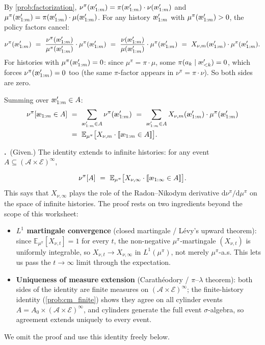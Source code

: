 \documentclass[fontsize=11pt, parskip=half]{scrartcl}
\theoremstyle{definition}
\newenvironment{solution}{%
    \begin{tcolorbox}[colback=black!5!white, colframe=black!50!white,
      title={\textbf{Solution}}, fonttitle=\normalfont, breakable]
  }{\end{tcolorbox}}
\newenvironment{solution}{\expandafter\comment}{\expandafter\endcomment}
\newcommand{\mysubsection}[2]{\par\medskip\noindent\refstepcounter{subsection}\textbf{\thesubsection.}~#2\par\smallskip}
\newcommand{\cA}{\mathcal{A}}
\newcommand{\cE}{\mathcal{E}}
\newcommand{\Ex}{\mathbb{E}}
\newcommand{\aes}{\textnormal{\ae}}
\begin{document}
\begin{solution}
By \cref{prob:factorization}, $\nu^\pi(\aes'_{1:m}) = \pi(\aes'_{1:m}) \cdot \nu(\aes'_{1:m})$ and $\mu^\pi(\aes'_{1:m}) = \pi(\aes'_{1:m}) \cdot \mu(\aes'_{1:m})$.
For any history $\aes'_{1:m}$ with $\mu^\pi(\aes'_{1:m}) > 0$, the policy factors cancel:
\[
    \nu^\pi(\aes'_{1:m})
    ~=~ \frac{\nu^\pi(\aes'_{1:m})}{\mu^\pi(\aes'_{1:m})} \cdot \mu^\pi(\aes'_{1:m})
    ~=~ \frac{\nu(\aes'_{1:m})}{\mu(\aes'_{1:m})} \cdot \mu^\pi(\aes'_{1:m})
    ~=~ X_{\nu,m}(\aes'_{1:m}) \cdot \mu^\pi(\aes'_{1:m}).
\]
For histories with $\mu^\pi(\aes'_{1:m}) = 0$: since $\mu^\pi = \pi \cdot \mu$, some $\pi(a_k \mid \aes'_{<k}) = 0$, which forces $\nu^\pi(\aes'_{1:m}) = 0$ too (the same $\pi$-factor appears in $\nu^\pi = \pi \cdot \nu$). So both sides are zero.

Summing over $\aes'_{1:m} \in A$:
\begin{align*}
    \nu^\pi[\aes_{1:m} \in A]
    ~&=~ \sum_{\aes'_{1:m} \in A} \nu^\pi(\aes'_{1:m})
    ~=~ \sum_{\aes'_{1:m} \in A} X_{\nu,m}(\aes'_{1:m}) \cdot \mu^\pi(\aes'_{1:m}) \\
    ~&=~ \Ex_{\mu^\pi}\big[X_{\nu,m} \cdot \llbracket \aes_{1:m} \in A \rrbracket\big].
\end{align*}
\end{solution}

\mysubsection{2}{\textup{(Given.)} The identity extends to infinite histories: for any event $A \subseteq (\cA \times \cE)^\infty$, \label{prob:cm_extension}}
\[
    \nu^\pi[A] ~=~ \Ex_{\mu^\pi}\big[X_{\nu,\infty} \cdot \llbracket \aes_{1:\infty} \in A \rrbracket\big].
\]
This says that $X_{\nu,\infty}$ plays the role of the Radon--Nikodym derivative $\mathrm{d}\nu^\pi/\mathrm{d}\mu^\pi$ on the space of infinite histories. The proof rests on two ingredients beyond the scope of this worksheet:
\begin{itemize}
    \item \textbf{$L^1$ martingale convergence} (closed martingale / L\'evy's upward theorem): since $\Ex_{\mu^\pi}[X_{\nu,t}] = 1$ for every $t$, the non-negative $\mu^\pi$-martingale $(X_{\nu,t})$ is uniformly integrable, so $X_{\nu,t} \to X_{\nu,\infty}$ in $L^1(\mu^\pi)$, not merely $\mu^\pi$-a.s. This lets us pass the $t\to\infty$ limit through the expectation.
    \item \textbf{Uniqueness of measure extension} (Carath\'eodory / $\pi$--$\lambda$ theorem): both sides of the identity are finite measures on $(\cA\times\cE)^\infty$; the finite-history identity (\cref{prob:cm_finite}) shows they agree on all cylinder events $A = A_0 \times (\cA\times\cE)^\infty$, and cylinders generate the full event $\sigma$-algebra, so agreement extends uniquely to every event.
\end{itemize}
We omit the proof and use this identity freely below.
\end{document}

